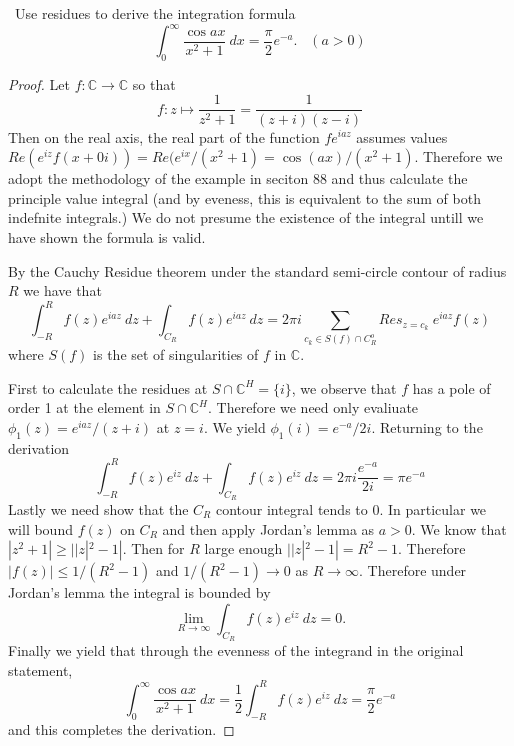 \documentclass[11pt]{amsart}
\theoremstyle{definition}
\numberwithin{theorem}{section}
\numberwithin{definition}{section}
\numberwithin{equation}{section}
\begin{document}
\medskip {}\ Use residues to derive the integration formula
\begin{equation*}
	\int_0^\infty \frac{\cos ax}{x^2 + 1}\ dx = \frac{\pi}{2}e^{-a}. \;\;\;(a > 0)
\end{equation*}
\begin{proof}
		Let $f: \mathbb{C} \to \mathbb{C}$ so that 
	\begin{equation*}
		f: z \mapsto \frac{1}{z^2 + 1} = \frac{1}{(z+i)(z-i)}
	\end{equation*}
	Then on the real axis, the real part of the  function $fe^{iaz}$ assumes values $Re(e^{iz}f(x + 0i)) = Re(e^{ix}/(x^2 + 1) = \cos(ax)/(x^2 + 1)$. Therefore we adopt the methodology of the example in seciton 88 and thus calculate the principle value integral (and by eveness, this is equivalent to the sum of both indefnite integrals.) We do not presume the existence of the integral untill we have shown the formula is valid.

	By the Cauchy Residue theorem under the standard semi-circle contour of radius $R$ we have that
	\begin{equation*}
		\int_{-R}^R f(z)e^{iaz}\ dz + \int_{C_R} f(z) e^{iaz}\ dz = 2\pi i \sum_{c_k \in S(f) \cap C_R^o} Res_{z=c_k}\ e^{iaz} f(z)
	\end{equation*}
	where $S(f)$ is the set of singularities of $f$ in $\mathbb{C}.$

	First to calculate the residues at $S \cap \mathbb{C}^H = \{i\}$, we observe that $f$ has a pole of order 1 at the element in $S \cap \mathbb{C}^H$. Therefore we need only evaliuate $\phi_1(z) = e^{iaz}/(z + i)$ at $z = i$. We yield $\phi_1(i) = e^{-a}/2i.$ Returning to the derivation
	\begin{equation*}
		\int_{-R}^R f(z)e^{iz}\ dz + \int_{C_R} f(z) e^{iz}\ dz = 2\pi i \frac{e^{-a}}{2i} = \pi e^{-a}
	\end{equation*}
	Lastly we need show that the $C_R$ contour integral tends to $0$.  In particular we will  bound $f(z)$ on $C_R$
	and then apply Jordan's lemma as $a > 0$.  We know that $|z^2 + 1| \geq ||z|^2 - 1|.$ Then for $R$ large enough $||z|^2 - 1| = R^2 - 1.$
	Therefore $|f(z)| \leq 1/(R^2 - 1)$ and $1/(R^2 - 1) \to 0$ as $R \to \infty.$
	Therefore under Jordan's lemma the integral is bounded by
	\begin{equation*}
		\lim_{R \to \infty} \int_{C_R} f(z) e^{iz}\ dz = 0.
	\end{equation*}
	Finally we yield that through the evenness of the integrand in the original statement,
	\begin{equation*}
		\int_0^\infty \frac{\cos ax}{x^2 + 1}\ dx = \frac{1}{2}  \int_{-R}^R f(z)e^{iz}\ dz = \frac{\pi}{2} e^{-a}
	\end{equation*}
	and this completes the derivation.
\end{proof}
\end{document}
